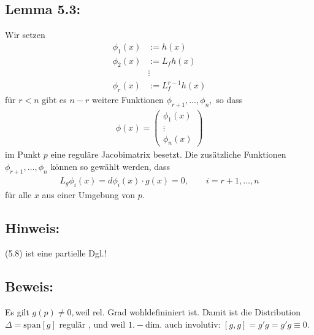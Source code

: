 \documentclass[ngerman]{tudscrreprt}
\begin{document}
\subsection*{Lemma 5.3:} Wir setzen \begin{align*} 
\phi_1(x)&:= h(x)\\
\phi_2(x)&:= L_fh(x)\\ 
& \vdots\\ 
\phi_r(x)&:= L_f^{r-1}h(x) \end{align*} für $r<n$ gibt es $n-r$ weitere Funktionen $\phi_{r+1},\dots, \phi_{n},$ so dass 
\begin{align*}
\phi(x) = \begin{pmatrix} \phi_1(x)\\ \vdots\\ \phi_n(x) \end{pmatrix} \tag{5.7} 
\end{align*} im Punkt $p$ eine reguläre Jacobimatrix besetzt. Die zusätzliche Funktionen $\phi_{r+1},\dots, \phi_n$ können so gewählt werden, dass \begin{align*} L_g \phi_i(x) = d\phi_i(x) \cdot g(x) = 0, \qquad i=r+1,\dots, n \tag{5.8} \end{align*}
für alle $x$ aus einer Umgebung von $p$. \\ 
\subsection*{Hinweis:} (5.8) ist eine partielle Dgl.!
\subsection*{Beweis:} Es gilt $g(p) \ne 0, $weil rel. Grad wohldefininiert ist.
Damit ist die Distribution $\Delta = \text{span} [g]$ regulär , und weil $1.-$dim. auch involutiv: $[g,g] = g'g = g'g \equiv 0.$
\end{document}
